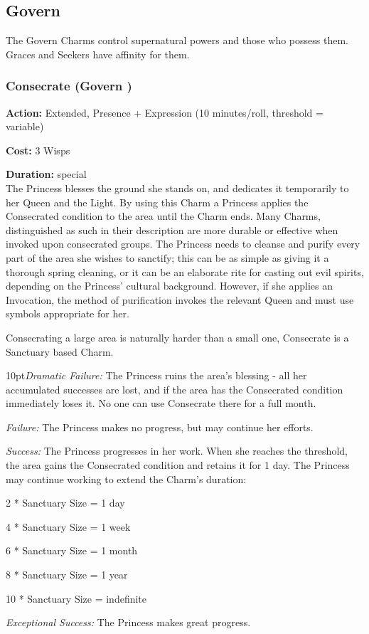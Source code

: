 \subsection*{Govern}
\label{subsec:Govern}
The Govern Charms control supernatural powers and those who possess them. Graces and Seekers have affinity for them.

\subsubsection*{Consecrate (Govern \textbullet)}

\noindent \textbf{Action:} Extended, Presence + Expression (10 minutes/roll, threshold = variable)

\noindent \textbf{Cost:} 3 Wisps

\noindent \textbf{Duration:} special\\

\noindent The Princess blesses the ground she stands on, and dedicates it temporarily to her Queen and the Light. By using this Charm a Princess applies the Consecrated condition to the area until the Charm ends. Many Charms, distinguished as such in their description are more durable or effective when invoked upon consecrated groups. The Princess needs to cleanse and purify every part of the area she wishes to sanctify; this can be as simple as giving it a thorough spring cleaning, or it can be an elaborate rite for casting out evil spirits, depending on the Princess' cultural background. However, if she applies an Invocation, the method of purification invokes the relevant Queen and must use symbols appropriate for her. 

Consecrating a large area is naturally harder than a small one, Consecrate is a Sanctuary based Charm. 

    \begin{myindentpar}{10pt}\emph{Dramatic Failure:} The Princess ruins the area's blessing - all her accumulated successes are lost, and if the area has the Consecrated  condition immediately loses it. No one can use Consecrate there for a full month.

    \emph{Failure:} The Princess makes no progress, but may continue her efforts.

    \emph{Success:} The Princess progresses in her work. When she reaches the threshold, the area gains the Consecrated condition and retains it for 1 day. The Princess may continue working to extend the Charm's duration:

    2 * Sanctuary Size = 1 day
    
    4 * Sanctuary Size = 1 week
    
    6 * Sanctuary Size = 1 month
    
    8 * Sanctuary Size = 1 year
    
    10 * Sanctuary Size = indefinite 

    \emph{Exceptional Success:} The Princess makes great progress.\end{myindentpar}

